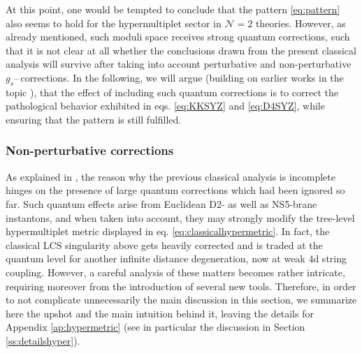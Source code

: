%
At this point, one would be tempted to conclude that the pattern \eqref{eq:pattern} also seems to hold for the hypermultiplet sector in $\mathcal{N}=2$ theories. However, as already mentioned, such moduli space receives strong quantum corrections, such that it is not clear at all whether the conclusions drawn from the present classical analysis will survive after taking into account perturbative and non-perturbative $g_s$--\,corrections. In the following, we will argue (building on earlier works in the topic \cite{Marchesano:2019ifh, Baume:2019sry, Alvarez-Garcia:2021pxo}), that the effect of including such quantum corrections is to correct the pathological behavior exhibited in  eqs. \eqref{eq:KKSYZ} and \eqref{eq:D4SYZ}, while ensuring that the pattern is still fulfilled. 
	
	
\subsubsection{Non-perturbative corrections}
\label{sss:instantons}
	
As explained in \cite{Marchesano:2019ifh, Baume:2019sry}, the reason why the previous classical analysis is incomplete hinges on the presence of large quantum corrections which had been ignored so far. Such quantum effects arise from Euclidean D2- as well as NS5-brane instantons, and when taken into account, they may strongly modify the tree-level hypermultiplet metric displayed in eq. \eqref{eq:classicalhypermetric}. In fact, the classical LCS singularity above gets heavily corrected and is traded at the quantum level for another infinite distance degeneration, now at weak 4d string coupling. However, a careful analysis of these matters becomes rather intricate, requiring moreover from the introduction of several new tools. Therefore, in order to not complicate unnecessarily the main discussion in this section, we summarize here the upshot and the main intuition behind it, leaving the details for Appendix \ref{ap:hypermetric} (see in particular the discussion in Section \ref{ss:detailshyper}). 
	
